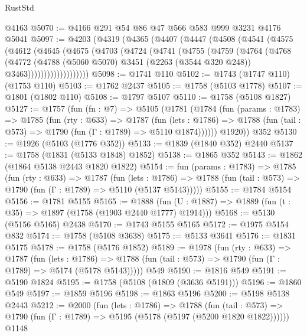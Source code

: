 \begin{lexlean}{RustStd}
\begin{coremodule}
{\begin{coremodule}
{{{{{{{{{{{{{{{    @4163
@5070 := @4166 @291 @54 @86 @47 @566 @583 @999 @3231 @4176 @5041
@5097 := @4203
    (@4319
      (@4365
        (@4407
          (@4447
            (@4508
              (@4541
                (@4575
                  (@4612
                    (@4645
                      (@4675
                        (@4703
                          (@4724
                            (@4741
                              (@4755
                                (@4759
                                  (@4764
                                    (@4768
                                      (@4772
                                        (@4788
                                          (@5060 @5070)
                                          @3451
                                          (@2263 (@3544 @320 @248))
                                          @3463)))))))))))))))))))
@5098 := @1741 @110
@5102 := @1743 (@1747 @110) (@1753 @110)
@5103 := @1762 @2437
@5105 := @1758 (@5103 @1778)
@5107 := @1801 (@1802 @110)
@5108 := @1797 @5107
@5110 := @1758 (@5108 @1827)
@5127 := @1757
    (fun (fn : @7) =>
    @5105
      (@1781
        (@1784
          (fun (params : @1783) =>
          @1785
            (fun (rty : @633) =>
            @1787
              (fun (lets : @1786) =>
              @1788 (fun (tail : @573) => @1790 (fun (Γ : @1789) => @5110 @1874))))))
        @1920))
    @352
@5130 := @1926 (@5103 (@1776 @352))
@5133 := @1839 (@1840 @352) @2440
@5137 := @1758 (@1831 (@5133 @1848) @1852)
@5138 := @1865 @352
@5143 := @1862 (@1864 @5138 @2443 @1820 @1822)
@5154 := fun (params : @1783) =>
  @1785
    (fun (rty : @633) =>
    @1787
      (fun (lets : @1786) =>
      @1788 (fun (tail : @573) => @1790 (fun (Γ : @1789) => @5110 (@5137 @5143)))))
@5155 := @1784 @5154
@5156 := @1781 @5155
@5165 := @1888 (fun (U : @1887) => @1889 (fun (t : @35) => @1897 (@1758 (@1903 @2440 @1777) @1914)))
@5168 := @5130 (@5156 @5165) @2438
@5170 := @1743 @5155 @5165
@5172 := @1975 @5154 @832
@5174 := @1758 (@5108 @3638)
@5175 := @5133 @3641
@5176 := @1831 @5175
@5178 := @1758 (@5176 @1852)
@5189 := @1978
    (fun (rty : @633) =>
    @1787
      (fun (lets : @1786) =>
      @1788 (fun (tail : @573) => @1790 (fun (Γ : @1789) => @5174 (@5178 @5143)))))
    @549
@5190 := @1816 @549
@5191 := @5190 @1824
@5195 := @1758 (@5108 (@1809 (@3636 @5191)))
@5196 := @1860 @549
@5197 := @1859 @5196
@5198 := @1863 @5196
@5200 := @5198 @5138 @2443
@5212 := @2000
    (fun (lets : @1786) =>
    @1788
      (fun (tail : @573) => @1790 (fun (Γ : @1789) => @5195 (@5178 (@5197 (@5200 @1820 @1822))))))
    @1148
}}}}}}}}}}}}}}}
\end{coremodule}}
\end{coremodule}
\end{lexlean}
